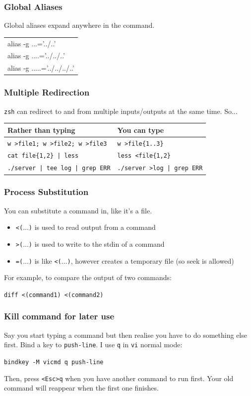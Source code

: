 \documentclass{beamer}
\begin{document}
\begin{frame}
    \frametitle{Global Aliases}
    \centering
    Global aliases expand anywhere in the command.

    \medskip
    {\Large\ttfamily
    \begin{tabular}{l}
    alias -g ...='../..' \\
    alias -g ....='../../..' \\
    alias -g .....='../../../..' \\
    \end{tabular}
    }
\end{frame}

\begin{frame}
    \frametitle{Multiple Redirection}
    \texttt{zsh} can redirect to and from multiple inputs/outputs at the same
    time. So...

    \medskip
    \small
    \begin{tabular}{l l}
        Rather than typing & You can type \\ \hline
        \texttt{w >file1; w >file2; w >file3} & \texttt{w >file\{1..3\}} \\
        \texttt{cat file\{1,2\} | less} & \texttt{less <file\{1,2\}} \\
        \texttt{./server | tee log | grep ERR} &
        \texttt{./server >log | grep ERR} \\
    \end{tabular}
\end{frame}

\begin{frame}
    \frametitle{Process Substitution}
    You can substitute a command in, like it's a file.
    \begin{itemize}
        \item \texttt{<($\ldots$)} is used to read output from a command
        \item \texttt{>($\ldots$)} is used to write to the stdin of a command
        \item \texttt{=($\ldots$)} is like \texttt{<($\ldots$)}, however
            creates a temporary file (so seek is allowed)
    \end{itemize}

    For example, to compare the output of two commands:

    \texttt{diff <(command1) <(command2)}
\end{frame}

\begin{frame}
    \frametitle{Kill command for later use}
    Say you start typing a command but then realise you have to do something
    else first. Bind a key to \texttt{push-line}. I use \texttt{q} in
    \texttt{vi} normal mode:

    \medskip
    \texttt{bindkey -M vicmd q push-line}
    \medskip

    Then, press \texttt{<Esc>q} when you have another command to run first.
    Your old command will reappear when the first one finishes.
\end{frame}
\end{document}
